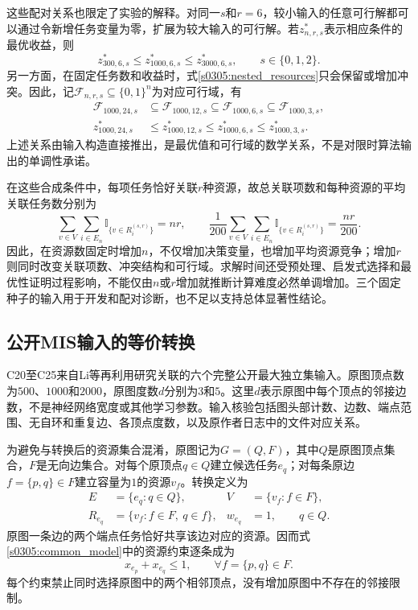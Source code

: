 这些配对关系也限定了实验的解释。对同一$s$和$r=6$，较小输入的任意可行解都可以通过令新增任务变量为零，扩展为较大输入的可行解。若$z_{n,r,s}^{*}$表示相应条件的最优收益，则
\begin{equation}
 z_{300,6,s}^{*}\leq z_{1000,6,s}^{*}
 \leq z_{3000,6,s}^{*},\qquad s\in\{0,1,2\}.
 \label{s0305:size_optimum_relation}
\end{equation}
另一方面，在固定任务数和收益时，式\eqref{s0305:nested_resources}只会保留或增加冲突。因此，记$\mathcal{F}_{n,r,s}\subseteq\{0,1\}^{n}$为对应可行域，有
\begin{align}
 \mathcal{F}_{1000,24,s}&\subseteq\mathcal{F}_{1000,12,s}
 \subseteq\mathcal{F}_{1000,6,s}\subseteq\mathcal{F}_{1000,3,s},
 \label{s0305:rank_feasible_relation}\\
 z_{1000,24,s}^{*}&\leq z_{1000,12,s}^{*}
 \leq z_{1000,6,s}^{*}\leq z_{1000,3,s}^{*}.
 \label{s0305:rank_optimum_relation}
\end{align}
上述关系由输入构造直接推出，是最优值和可行域的数学关系，不是对限时算法输出的单调性承诺。

在这些合成条件中，每项任务恰好关联$r$种资源，故总关联项数和每种资源的平均关联任务数分别为
\begin{equation}
 \sum_{v\in V}\sum_{i\in E_n}
 \mathbb{I}_{\{v\in R_i^{(s,r)}\}}=nr,
 \qquad
 \frac{1}{200}\sum_{v\in V}\sum_{i\in E_n}
 \mathbb{I}_{\{v\in R_i^{(s,r)}\}}=\frac{nr}{200}.
 \label{s0305:synthetic_incidence}
\end{equation}
因此，在资源数固定时增加$n$，不仅增加决策变量，也增加平均资源竞争；增加$r$则同时改变关联项数、冲突结构和可行域。求解时间还受预处理、启发式选择和最优性证明过程影响，不能仅由$n$或$r$增加就推断计算难度必然单调增加。三个固定种子的输入用于开发和配对诊断，也不足以支持总体显著性结论。

\subsection{公开MIS输入的等价转换}

C20至C25来自Li等再利用研究关联的六个完整公开最大独立集输入\cite{LiHypOp2025}。原图顶点数为$500$、$1000$和$2000$，原图度数$d$分别为$3$和$5$。这里$d$表示原图中每个顶点的邻接边数，不是神经网络宽度或其他学习参数。输入核验包括图头部计数、边数、端点范围、无自环和重复边、各顶点度数，以及原作者日志中的文件对应关系。

为避免与转换后的资源集合混淆，原图记为$G=(Q,F)$，其中$Q$是原图顶点集合，$F$是无向边集合。对每个原顶点$q\in Q$建立候选任务$e_q$；对每条原边$f=\{p,q\}\in F$建立容量为$1$的资源$v_f$。转换定义为
\begin{align}
 E&=\{e_q:q\in Q\},&
 V&=\{v_f:f\in F\},\label{s0305:mis_objects}\\
 R_{e_q}&=\{v_f:f\in F,\ q\in f\},&
 w_{e_q}&=1,\qquad q\in Q.
 \label{s0305:mis_mapping}
\end{align}
原图一条边的两个端点任务恰好共享该边对应的资源。因而式\eqref{s0305:common_model}中的资源约束逐条成为
\begin{equation}
 x_{e_p}+x_{e_q}\leq1,
 \qquad \forall f=\{p,q\}\in F.
 \label{s0305:mis_constraints}
\end{equation}
每个约束禁止同时选择原图中的两个相邻顶点，没有增加原图中不存在的邻接限制。

